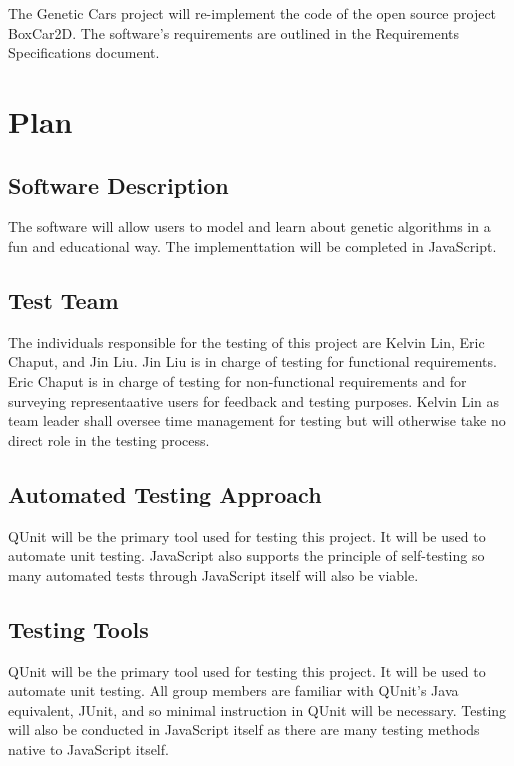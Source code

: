 \documentclass[12pt, titlepage]{article}
\begin{document}
The Genetic Cars project will re-implement the code of the open source project BoxCar2D. The software's requirements are outlined in the Requirements Specifications document.

\section{Plan}
	
\subsection{Software Description}

The software will allow users to model and learn about genetic algorithms in a fun and educational way. The implementtation will be completed in JavaScript.

\subsection{Test Team}

The individuals responsible for the testing of this project are  Kelvin Lin, Eric Chaput, and  Jin Liu. Jin Liu is in charge of testing for functional requirements. Eric Chaput is in charge of testing for non-functional requirements and for surveying representaative users for feedback and testing purposes. Kelvin Lin as team leader shall oversee time management for testing but will otherwise take no direct role in the testing process.

\subsection{Automated Testing Approach}

QUnit will be the primary tool used for testing this project. It will be used to automate unit testing. JavaScript also supports the principle of self-testing so many automated tests through JavaScript itself will also be viable.

\subsection{Testing Tools}

QUnit will be the primary tool used for testing this project. It will be used to automate unit testing. All group members are familiar with QUnit's Java equivalent, JUnit, and so minimal instruction in QUnit will be necessary. Testing will also be conducted in JavaScript itself as there are many testing methods native to JavaScript itself.
\end{document}
